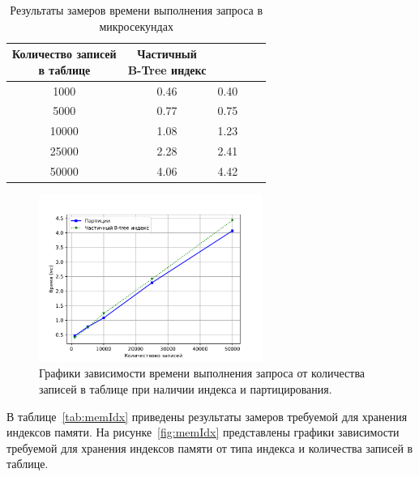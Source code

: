 \begin{table}[H]
	\begin{center}
		\begin{center}
			\caption{\label{tab:timePart}Результаты замеров времени выполнения запроса в микросекундах}
		\end{center}
		\begin{tabular}{|c|c|c|c|c|}
			\hline 
			\specialcell{Количество записей\\ в таблице} & \specialcell{Частичный \\B-Tree индекс} & \specialcell{Партицирование}  \\\hline
		1000 & 0.46 & 		0.40  \\ \hline
		5000 & 0.77 & 		0.75  \\ \hline
		10000 & 1.08 & 		1.23  \\ \hline
		25000 & 2.28 & 		2.41  \\ \hline
		50000 & 4.06 & 		4.42  \\ \hline
		\end{tabular}
	\end{center}
\end{table}

\begin{figure}[h]
	\centering
	\includegraphics[width=0.65\textwidth, height=0.32\textheight]{research/res_part_partly}
	\caption{Графики зависимости времени выполнения запроса от количества записей в таблице при наличии индекса и партицирования.}
	\label{fig:timePart}
\end{figure}
В таблице~\ref{tab:memIdx} приведены результаты замеров требуемой для хранения индексов памяти.
На рисунке~\ref{fig:memIdx} представлены графики зависимости требуемой для хранения индексов памяти от типа индекса и количества записей в таблице.

